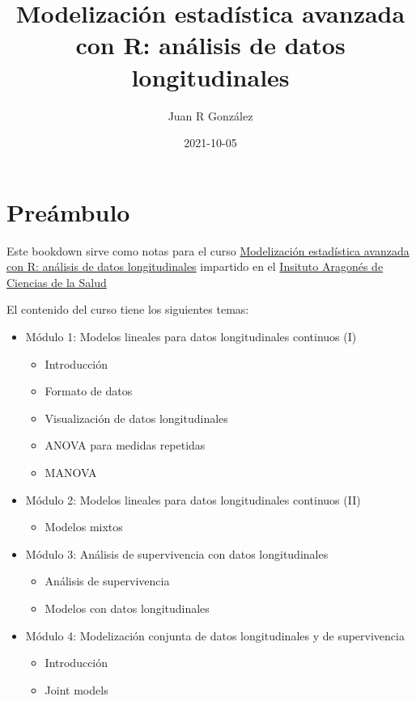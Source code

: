 \documentclass[
]{book}
\title{Modelización estadística avanzada con R: análisis de datos longitudinales}
\author{Juan R González}
\date{2021-10-05}
\providecommand{\tightlist}{%
  \setlength{\itemsep}{0pt}\setlength{\parskip}{0pt}}
\begin{document}
\maketitle

{
\setcounter{tocdepth}{1}
\tableofcontents
}
\hypertarget{preuxe1mbulo}{%
\chapter{Preámbulo}\label{preuxe1mbulo}}

Este bookdown sirve como notas para el curso \href{https://www.iisaragon.es/event/curso-modelizacion-estadistica-avanzada-con-r-analisis-de-datos-longitudinales-iacs/}{Modelización estadística avanzada con R: análisis de datos longitudinales} impartido en el \href{https://www.iacs.es/}{Insituto Aragonés de Ciencias de la Salud}

El contenido del curso tiene los siguientes temas:

\begin{itemize}
\tightlist
\item
  Módulo 1: Modelos lineales para datos longitudinales continuos (I)

  \begin{itemize}
  \tightlist
  \item
    Introducción
  \item
    Formato de datos
  \item
    Visualización de datos longitudinales
  \item
    ANOVA para medidas repetidas
  \item
    MANOVA
  \end{itemize}
\item
  Módulo 2: Modelos lineales para datos longitudinales continuos (II)

  \begin{itemize}
  \tightlist
  \item
    Modelos mixtos
  \end{itemize}
\item
  Módulo 3: Análisis de supervivencia con datos longitudinales

  \begin{itemize}
  \tightlist
  \item
    Análisis de supervivencia
  \item
    Modelos con datos longitudinales
  \end{itemize}
\item
  Módulo 4: Modelización conjunta de datos longitudinales y de supervivencia

  \begin{itemize}
  \tightlist
  \item
    Introducción
  \item
    Joint models
  \end{itemize}
\end{itemize}
\end{document}
